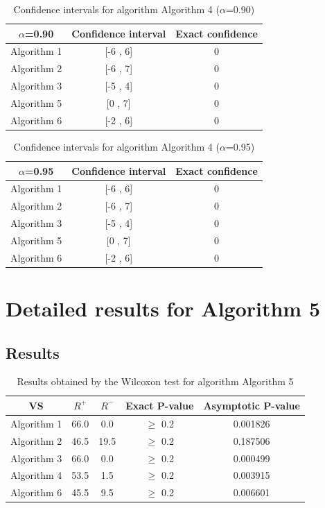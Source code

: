 \documentclass[a4paper,10pt]{article}
\begin{document}
\begin{table}[!htp]
\centering\small
\begin{tabular}{
|c|c|c|}
\hline
 $\alpha$=0.90 & Confidence interval & Exact confidence \\ \hline 
Algorithm 1 & [-6 , 6] & 0\\ \hline 
Algorithm 2 & [-6 , 7] & 0\\ \hline 
Algorithm 3 & [-5 , 4] & 0\\ \hline 
Algorithm 5 & [0 , 7] & 0\\ \hline 
Algorithm 6 & [-2 , 6] & 0\\ \hline 

\end{tabular}
\caption{Confidence intervals for algorithm Algorithm 4 ($\alpha$=0.90)}
\end{table}
\begin{table}[!htp]
\centering\small
\begin{tabular}{
|c|c|c|}
\hline
 $\alpha$=0.95 & Confidence interval & Exact confidence \\ \hline 
Algorithm 1 & [-6 , 6] & 0\\ \hline 
Algorithm 2 & [-6 , 7] & 0\\ \hline 
Algorithm 3 & [-5 , 4] & 0\\ \hline 
Algorithm 5 & [0 , 7] & 0\\ \hline 
Algorithm 6 & [-2 , 6] & 0\\ \hline 

\end{tabular}
\caption{Confidence intervals for algorithm Algorithm 4 ($\alpha$=0.95)}
\end{table}

 \clearpage 


\section{Detailed results for Algorithm 5}


\subsection{Results}

\begin{table}[!htp]
\centering\small
\begin{tabular}{
|c|c|c|c|c|}
\hline
 VS & $R^{+}$ & $R^{-}$ & Exact P-value & Asymptotic P-value \\ \hline 
Algorithm 1 & 66.0 & 0.0 & $\geq$ 0.2 & 0.001826\\ \hline 
Algorithm 2 & 46.5 & 19.5 & $\geq$ 0.2 & 0.187506\\ \hline 
Algorithm 3 & 66.0 & 0.0 & $\geq$ 0.2 & 0.000499\\ \hline 
Algorithm 4 & 53.5 & 1.5 & $\geq$ 0.2 & 0.003915\\ \hline 
Algorithm 6 & 45.5 & 9.5 & $\geq$ 0.2 & 0.006601\\ \hline 

\end{tabular}
\caption{Results obtained by the Wilcoxon test for algorithm Algorithm 5}
\end{table}
\end{document}
